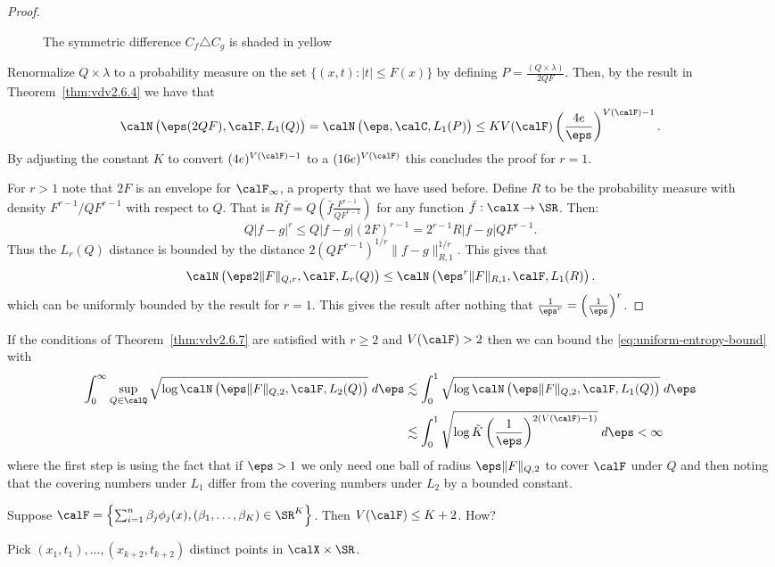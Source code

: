\begin{proof}
\begin{figure}[htpb]
\begin{tikzpicture}
		\end{tikzpicture}
		\caption{The symmetric difference \(C_f\triangle C_g\) is shaded in yellow}%
		\label{fig:symmetric-diff}	
	\end{figure}
	Renormalize \(Q\times\lambda\) to a probability measure on the set \(\{(x,t): |t|\leq F(x)\}\) by defining \(P = \frac{(Q\times\lambda)}{2QF}\). Then, by the result in Theorem~\ref{thm:vdv2.6.4} we have that
	\[
		\calN\left(\eps(2QF), \calF, L_1(Q)\right) = \calN\left(\eps,\calC,L_1(P)\right) \leq  KV(\calF)\left(\frac{4e}{\eps}\right)^{V(\calF)-1}
	.\]
	By adjusting the constant \(K\) to convert \((4e)^{V(\calF)-1}\) to a \((16e)^{V(\calF)}\) this concludes the proof for \(r=1\).

	For \(r > 1\) note that \(2F\) is an envelope for \(\calF_\infty\), a property that we have used before. Define \(R\) to be the probability measure with density \(F^{r-1}/QF^{r-1} \) with respect to \(Q\). That is \(R\bar f = Q\left(\bar f\frac{F^{r-1}}{QF^{r-1}}\right)\) for any function \(\bar f:\calX\to\SR\). Then:
	\[
		Q|f-g|^r \leq  Q|f-g|(2F)^{r-1} = 2^{r-1}R|f-g|QF^{r-1} 
	.\]
	Thus the \(L_r(Q)\) distance is bounded by the distance \(2(QF^{r-1})^{1/r}\|f-g\|_{R,1}^{1/r}\). This gives that 
	\[
		\calN\left(\eps 2\|F\|_{Q,r},\calF,L_r(Q)\right) \leq \calN\left(\eps^r \|F\|_{R,1},\calF,L_1(R)\right)
	.\] 
	which can be uniformly bounded by the result for \(r=1\). This gives the result after nothing that \(\frac{1}{\eps^r} = \left(\frac{1}{\eps}\right)^r\).
\end{proof}
If the conditions of Theorem~\ref{thm:vdv2.6.7} are satisfied with \(r \geq 2\) and \(V(\calF) > 2\) then we can bound the \eqref{eq:uniform-entropy-bound} with
\begin{align*}
	\int_{0}^{\infty} \sup_{Q\in\calQ} \sqrt{\log\calN\left(\eps\|F\|_{Q,2},\calF,L_2(Q)\right)}\;d\eps 
	&\lesssim \int_{0}^{1} \sqrt{\log\calN\left(\eps\|F\|_{Q,2},\calF,L_1(Q)\right)}\;d\eps \\  
	&\lesssim \int_{0}^{1} \sqrt{\log \tilde K \left(\frac{1}{\eps}\right)^{2(V(\calF)-1)}}\;d\eps < \infty 
\end{align*}
where the first step is using the fact that if \(\eps > 1\) we only need one ball of radius \(\eps\|F\|_{Q,2}\) to cover \(\calF\) under \(Q\)  and then noting that the covering numbers under \(L_1\) differ from the covering numbers under \(L_2\) by a bounded constant.

\begin{example*}
	Suppose \(\calF = \left\{\sum_{i=1}^n \beta_j\phi_j(x), \left(\beta_1,\dots,\beta_K\right)\in\SR^K\right\}\). Then \(V(\calF) \leq K+2\). How? 

	Pick \((x_1,t_1),\dots,(x_{k+2},t_{k+2})\) distinct points in \(\calX\times\SR\).
\end{example*}

